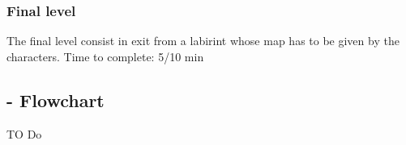 \subsubsection{Final level}
The final level consist in exit from a labirint whose map has to be given by the characters.
Time to complete: 5/10 min

\subsection{- Flowchart}
TO Do
